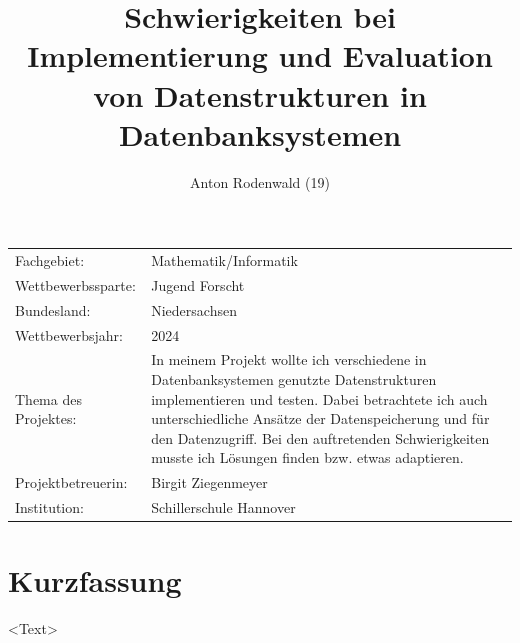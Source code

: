 \documentclass[11pt,a4paper]{article}
\begin{document}
\title{Schwierigkeiten bei Implementierung und Evaluation von Datenstrukturen in Datenbanksystemen}
\author{Anton Rodenwald (19)}
\maketitle

\addtocounter{page}{-3}
\thispagestyle{empty}

\large
\begin{tabular}{l p{12cm}}

    Fachgebiet:          & Mathematik/Informatik      \\

    Wettbewerbssparte:   & Jugend Forscht             \\

    Bundesland:          & Niedersachsen              \\

    Wettbewerbsjahr:     & 2024                       \\

    Thema des Projektes: &
    In meinem Projekt wollte ich verschiedene in Datenbanksystemen genutzte Datenstrukturen
    implementieren und testen. Dabei betrachtete ich auch unterschiedliche Ansätze der
    Datenspeicherung und für den Datenzugriff. Bei den auftretenden Schwierigkeiten
    musste ich Lösungen finden bzw. etwas adaptieren. \\

    Projektbetreuerin:   & Birgit Ziegenmeyer         \\

    Institution:         & Schillerschule Hannover    \\
\end{tabular}

\clearpage

\pagestyle{empty}


\section*{Kurzfassung}

<Text>

\clearpage


\renewcommand*\contentsname{Inhaltsverzeichnis}


\tableofcontents
\end{document}
